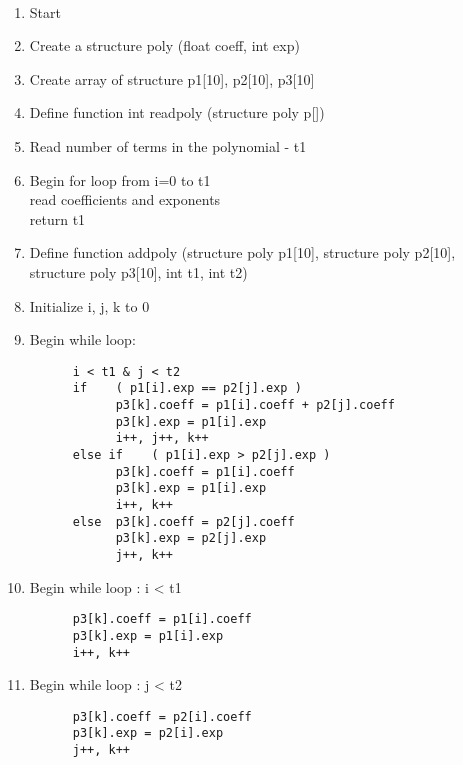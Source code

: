 \documentclass{article}
\begin{document}
  \\
\begin{enumerate}
    \item Start

    \item Create a structure poly (float coeff, int exp)

    \item Create array of structure p1[10], p2[10], p3[10]

    \item Define function int readpoly (structure poly p[])
    
    \item Read number of terms in the polynomial - t1

    \item Begin for loop from i=0 to t1 \\ read coefficients and exponents \\ return t1
    
    \item Define function addpoly (structure poly p1[10], structure poly p2[10], structure poly p3[10], int t1, int t2)
    
    \item Initialize i, j, k to 0

    \item Begin while loop: 
    \begin{verbatim}
      i < t1 & j < t2
      if    ( p1[i].exp == p2[j].exp )
            p3[k].coeff = p1[i].coeff + p2[j].coeff
            p3[k].exp = p1[i].exp
            i++, j++, k++
      else if    ( p1[i].exp > p2[j].exp )
            p3[k].coeff = p1[i].coeff
            p3[k].exp = p1[i].exp
            i++, k++
      else  p3[k].coeff = p2[j].coeff
            p3[k].exp = p2[j].exp
            j++, k++
    \end{verbatim}

    \item Begin while loop : i < t1
    \begin{verbatim}
      p3[k].coeff = p1[i].coeff
      p3[k].exp = p1[i].exp
      i++, k++
    \end{verbatim}

    \item Begin while loop : j < t2
    \begin{verbatim}
      p3[k].coeff = p2[i].coeff
      p3[k].exp = p2[i].exp
      j++, k++
    \end{verbatim}


\end{enumerate}
\end{document}
